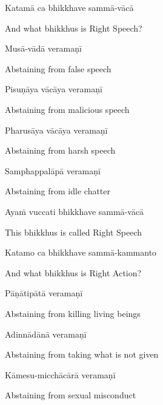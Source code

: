 Katamā ca bhikkhave sammā-vācā

\begin{cprenglish}
  And what bhikkhus is Right Speech?
\end{cprenglish}

Musā-vādā veramaṇī

\begin{cprenglish}
  Abstaining from false speech
\end{cprenglish}

Pisuṇāya vācāya veramaṇī

\begin{cprenglish}
  Abstaining from malicious speech
\end{cprenglish}

Pharusāya vācāya veramaṇī

\begin{cprenglish}
  Abstaining from harsh speech
\end{cprenglish}

Samphappalāpā veramaṇī

\begin{cprenglish}
  Abstaining from idle chatter
\end{cprenglish}

Ayaṁ vuccati bhikkhave sammā-vācā

\begin{cprenglish}
  This bhikkhus is called Right Speech
\end{cprenglish}

Katamo ca bhikkhave sammā-kammanto

\begin{cprenglish}
  And what bhikkhus is Right Action?
\end{cprenglish}

Pāṇātipātā veramaṇī

\begin{cprenglish}
  Abstaining from killing living beings
\end{cprenglish}

Adinnādānā veramaṇī

\begin{cprenglish}
  Abstaining from taking what is not given
\end{cprenglish}

Kāmesu-micchācārā veramaṇī

\begin{cprenglish}
  Abstaining from sexual misconduct
\end{cprenglish}


